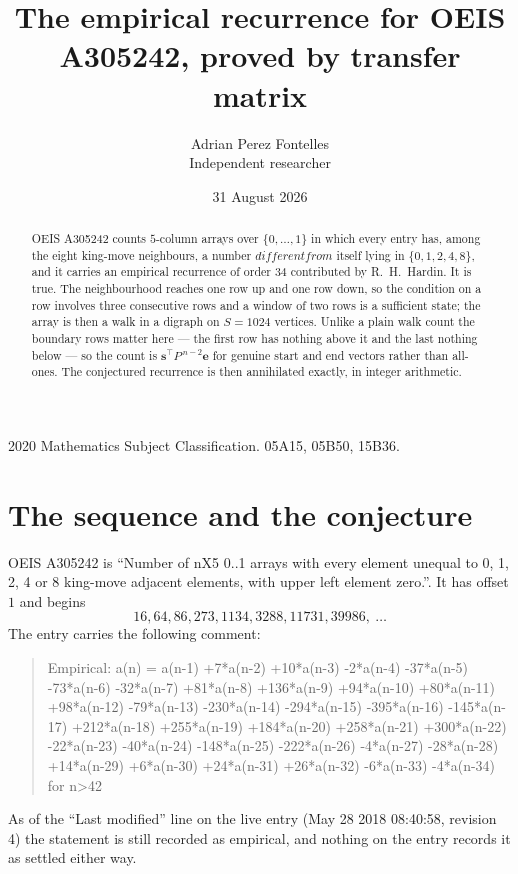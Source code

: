 \documentclass[11pt,a4paper]{article}
\title{The empirical recurrence for OEIS A305242, proved by transfer matrix}
\author{Adrian Perez Fontelles\\ \small Independent researcher}
\date{31 August 2026}
\theoremstyle{plain}
\theoremstyle{definition}
\begin{document}
\maketitle

\begin{abstract}
OEIS A305242 counts $5$-column arrays over $\{0,\dots,1\}$ in which every entry has,
among the eight king-move neighbours, a number $different from$ itself lying in $\{0,1,2,4,8\}$, and it carries an empirical
recurrence of order $34$ contributed by R.~H.~Hardin. It is true. The neighbourhood
reaches one row up and one row down, so the condition on a row involves three consecutive
rows and a window of two rows is a sufficient state; the array is then a walk in a digraph
on $S=1024$ vertices. Unlike a plain walk count the boundary rows matter here --- the first
row has nothing above it and the last nothing below --- so the count is
$\mathbf{s}^{\!\top}P^{\,n-2}\mathbf{e}$ for genuine start and end vectors rather than
all-ones. The conjectured recurrence is then annihilated exactly, in integer arithmetic.
\end{abstract}

\noindent\small 2020 Mathematics Subject Classification. 05A15, 05B50, 15B36.\normalsize

\section{The sequence and the conjecture}

OEIS A305242 is ``Number of nX5 0..1 arrays with every element unequal to 0, 1, 2, 4 or 8 king-move adjacent elements, with upper left element zero.''. It has offset
$1$ and begins
\[
16, 64, 86, 273, 1134, 3288, 11731, 39986,\ \dots
\]
The entry carries the following comment:
\begin{quote}\small
Empirical: a(n) = a(n-1) +7*a(n-2) +10*a(n-3) -2*a(n-4) -37*a(n-5) -73*a(n-6) -32*a(n-7) +81*a(n-8) +136*a(n-9) +94*a(n-10) +80*a(n-11) +98*a(n-12) -79*a(n-13) -230*a(n-14) -294*a(n-15) -395*a(n-16) -145*a(n-17) +212*a(n-18) +255*a(n-19) +184*a(n-20) +258*a(n-21) +300*a(n-22) -22*a(n-23) -40*a(n-24) -148*a(n-25) -222*a(n-26) -4*a(n-27) -28*a(n-28) +14*a(n-29) +6*a(n-30) +24*a(n-31) +26*a(n-32) -6*a(n-33) -4*a(n-34) for n>42
\end{quote}
As of the ``Last modified'' line on the live entry (May 28 2018 08:40:58, revision
4) the statement is still recorded as empirical, and nothing on the entry
records it as settled either way.
\end{document}
